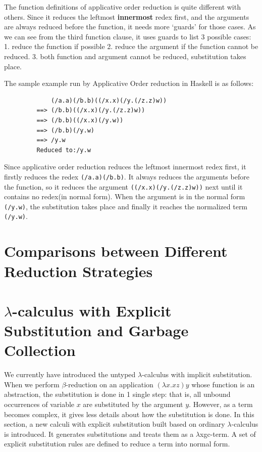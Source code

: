 The function definitions of applicative order reduction is quite different with others. Since it reduces the leftmost \textbf{innermost} redex first, and the arguments are always reduced before the function, it needs more `guards' for those cases. As we can see from the third function clause, it uses guards to list 3 possible cases: 1. reduce the function if possible 2. reduce the argument if the function cannot be reduced. 3. both function and argument cannot be reduced, substitution takes place. 


\begin{exmp}
\normalfont The sample example run by Applicative Order reduction in Haskell is as follows:
\end{exmp}

\begin{verbatim}
             (/a.a)(/b.b)((/x.x)(/y.(/z.z)w))
         ==> (/b.b)((/x.x)(/y.(/z.z)w))
         ==> (/b.b)((/x.x)(/y.w))
         ==> (/b.b)(/y.w)
         ==> /y.w
         Reduced to:/y.w
\end{verbatim}

Since applicative order reduction reduces the leftmost innermost redex first, it firstly reduces the redex \verb|(/a.a)(/b.b)|. It always reduces the arguments before the function, so it reduces the argument \verb|((/x.x)(/y.(/z.z)w))| next until it contains no redex(in normal form). When the argument is in the normal form \verb|(/y.w)|, the substitution takes place and finally it reaches the normalized term \verb|(/y.w)|.


\section{Comparisons between Different Reduction Strategies }


\section{$\lambda$-calculus with Explicit Substitution and Garbage Collection}

We currently have introduced the untyped $\lambda$-calculus with implicit substitution. When we perform $\beta$-reduction on an application $(\lambda x.xz)y$ whose function is an abstraction, the substitution is done in 1 single step: that is, all unbound occurrences of variable $x$ are substituted by the argument $y$. However, as a term becomes complex, it gives less details about how the substitution is done. In this section, a new calculi with explicit substitution built based on ordinary $\lambda$-calculus is introduced. It generates substitutions and treats them as a $\lambda$xgc-term. A set of explicit substitution rules are defined to reduce a term into normal form.  

